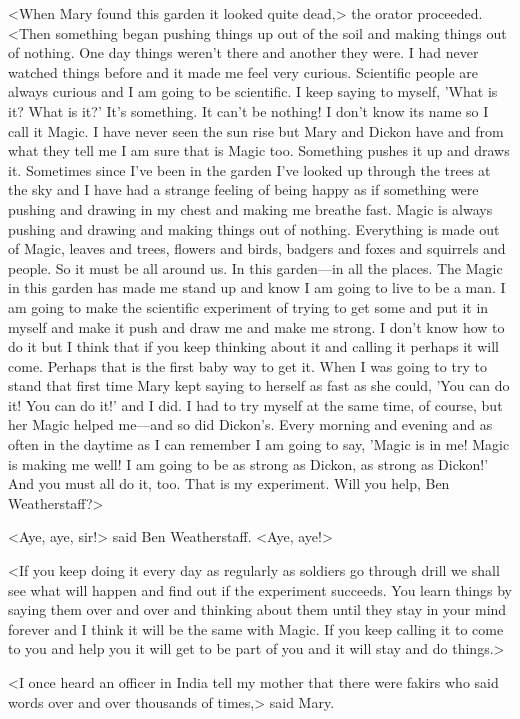 <When Mary found this garden it looked quite dead,> the orator proceeded. <Then something began pushing things up out of the soil and making things out of nothing. One day things weren't there and another they were. I had never watched things before and it made me feel very curious. Scientific people are always curious and I am going to be scientific. I keep saying to myself, 'What is it? What is it?' It's something. It can't be nothing! I don't know its name so I call it Magic. I have never seen the sun rise but Mary and Dickon have and from what they tell me I am sure that is Magic too. Something pushes it up and draws it. Sometimes since I've been in the garden I've looked up through the trees at the sky and I have had a strange feeling of being happy as if something were pushing and drawing in my chest and making me breathe fast. Magic is always pushing and drawing and making things out of nothing. Everything is made out of Magic, leaves and trees, flowers and birds, badgers and foxes and squirrels and people. So it must be all around us. In this garden—in all the places. The Magic in this garden has made me stand up and know I am going to live to be a man. I am going to make the scientific experiment of trying to get some and put it in myself and make it push and draw me and make me strong. I don't know how to do it but I think that if you keep thinking about it and calling it perhaps it will come. Perhaps that is the first baby way to get it. When I was going to try to stand that first time Mary kept saying to herself as fast as she could, 'You can do it! You can do it!' and I did. I had to try myself at the same time, of course, but her Magic helped me—and so did Dickon's. Every morning and evening and as often in the daytime as I can remember I am going to say, 'Magic is in me! Magic is making me well! I am going to be as strong as Dickon, as strong as Dickon!' And you must all do it, too. That is my experiment. Will you help, Ben Weatherstaff?>

<Aye, aye, sir!> said Ben Weatherstaff. <Aye, aye!>

<If you keep doing it every day as regularly as soldiers go through drill we shall see what will happen and find out if the experiment succeeds. You learn things by saying them over and over and thinking about them until they stay in your mind forever and I think it will be the same with Magic. If you keep calling it to come to you and help you it will get to be part of you and it will stay and do things.>

<I once heard an officer in India tell my mother that there were fakirs who said words over and over thousands of times,> said Mary.

